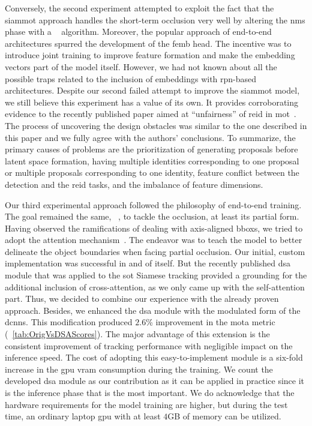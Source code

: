 Conversely, the second experiment attempted to exploit the fact that the \gls{siammot} approach handles the short-term occlusion very well by altering the \gls{nms} phase with a \featurenms{}~\cite{salscheider2020featurenms} algorithm. Moreover, the popular approach of end-to-end architectures spurred the development of the \gls{femb} head. The incentive was to introduce joint training to improve feature formation and make the embedding vectors part of the model itself. However, we had not known about all the possible traps related to the inclusion of embeddings with \gls{rpn}-based architectures. Despite our second failed attempt to improve the \gls{siammot} model, we still believe this experiment has a value of its own. It provides corroborating evidence to the recently published paper aimed at ``unfairness'' of \gls{reid} in \gls{mot}~\cite{zhang2021fairmot}. The process of uncovering the design obstacles was similar to the one described in this paper and we fully agree with the authors' conclusions. To summarize, the primary causes of problems are the prioritization of generating proposals before latent space formation, having multiple identities corresponding to one proposal or multiple proposals corresponding to one identity, feature conflict between the detection and the \gls{reid} tasks, and the imbalance of feature dimensions.

Our third experimental approach followed the philosophy of end-to-end training. The goal remained the same, \ietext{}~, to tackle the occlusion, at least its partial form. Having observed the ramifications of dealing with axis-aligned \glspl{bbox}, we tried to adopt the attention mechanism~\cite{vaswani2017attention}. The endeavor was to teach the model to better delineate the object boundaries when facing partial occlusion. Our initial, custom implementation was successful in and of itself. But the recently published \gls{dsa}~\cite{yu2021dsa} module that was applied to the \gls{sot} Siamese tracking provided a grounding for the additional inclusion of cross-attention, as we only came up with the self-attention part. Thus, we decided to combine our experience with the already proven approach. Besides, we enhanced the \gls{dsa} module with the modulated form of the \glspl{dcnn}. This modification produced $2.6$\% improvement in the \gls{mota} metric (\tabletext{}~\ref{tab:OrigVsDSAScores}). The major advantage of this extension is the consistent improvement of tracking performance with negligible impact on the inference speed. The cost of adopting this easy-to-implement module is a six-fold increase in the \gls{gpu} \gls{vram} consumption during the training. We count the developed \gls{dsa} module as our contribution as it can be applied in practice since it is the inference phase that is the most important. We do acknowledge that the hardware requirements for the model training are higher, but during the test time, an ordinary laptop \gls{gpu} with at least $4$GB of memory can be utilized.

